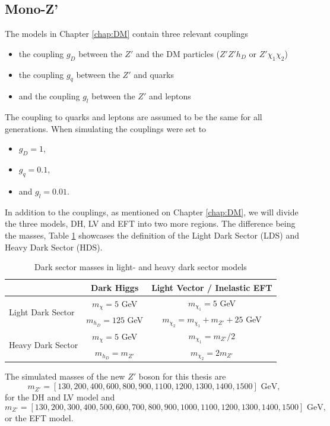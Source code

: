 \documentclass[12pt, a4paper]{book}
\begin{document}
\subsection{Mono-Z'}
The models in Chapter \ref{chap:DM} contain three relevant couplings
\begin{itemize}
    \item the coupling $g_D$ between the $Z'$ and the DM particles ($Z'Z'h_D$ or $Z'\chi_1\chi_2$)
    \item the coupling $g_q$ between the $Z'$ and quarks
    \item and the coupling $g_l$ between the $Z'$ and leptons
\end{itemize}
The coupling to quarks and leptons are assumed to be the same for all generations. When simulating the couplings were set to
\begin{itemize}
    \item $g_D = 1$,
    \item $g_q=0.1$,
    \item and $g_l=0.01$.
\end{itemize}
In addition to the couplings, as mentioned on Chapter \ref{chap:DM}, we will divide the three models, DH, LV and EFT into two more regions. The difference being the masses, Table \ref{tab:DMass} showcases the definition of the Light Dark Sector (LDS) and Heavy Dark Sector (HDS).
\begin{table}[!h]
    \centering\caption{Dark sector masses in light- and heavy dark sector models}
    \begin{tabular}{l|c|c}\midrule\midrule
                                                                            & Dark Higgs            & Light Vector / Inelastic EFT              \\\midrule
        \multirow{2}{*}[-2\baselineskip]{Light Dark Sector}                 & $m_\chi = 5$ GeV      & $m_{\chi_1}= 5$ GeV                       \\
                                                                            & $m_{h_D} = 125$ GeV   & $m_{\chi_2}= m_{\chi_1}+m_{Z'} + 25$ GeV  \\\midrule
        \multirow{2}{*}[-2\baselineskip]{Heavy Dark Sector}                 & $m_\chi = 5$ GeV      & $m_{\chi_1}= m_{Z'}/2$                    \\
                                                                            & $m_{h_D} = m_{Z'}$    & $m_{\chi_2}= 2m_{Z'}$                     \\\midrule\midrule
    \end{tabular}
    \label{tab:DMass}
\end{table}
\newpage\noindent The simulated masses of the new $Z'$ boson for this thesis are
$$
m_{Z'} = [130, 200, 400, 600, 800, 900, 1100, 1200, 1300, 1400, 1500]\text{ GeV},
$$
for the DH and LV model and 
$$
m_{Z'} = [130, 200, 300, 400, 500, 600, 700, 800, 900, 1000, 1100, 1200, 1300, 1400, 1500]\text{ GeV},
$$
or the EFT model.
\end{document}
